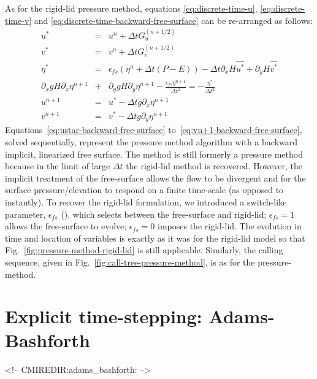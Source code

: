 As for the rigid-lid pressure method, equations
\ref{eq:discrete-time-u}, \ref{eq:discrete-time-v} and
\ref{eq:discrete-time-backward-free-surface} can be re-arranged as follows:
\begin{eqnarray}
u^{*} & = & u^{n} + \Delta t G_u^{(n+1/2)} \label{eq:ustar-backward-free-surface} \\
v^{*} & = & v^{n} + \Delta t G_v^{(n+1/2)} \label{eq:vstar-backward-free-surface} \\
\eta^* & = & \epsilon_{fs} \left( \eta^{n} + \Delta t (P-E) \right)- \Delta t 
  \partial_x H \widehat{u^{*}}
+ \partial_y H \widehat{v^{*}}
\\
  \partial_x g H \partial_x \eta^{n+1}
& + & \partial_y g H \partial_y \eta^{n+1}
 - \frac{\epsilon_{fs} \eta^{n+1}}{\Delta t^2}
 = 
- \frac{\eta^*}{\Delta t^2}
\label{eq:elliptic-backward-free-surface}
\\
u^{n+1} & = & u^{*} - \Delta t g \partial_x \eta^{n+1} \label{eq:un+1-backward-free-surface}\\
v^{n+1} & = & v^{*} - \Delta t g \partial_y \eta^{n+1} \label{eq:vn+1-backward-free-surface}
\end{eqnarray}
Equations~\ref{eq:ustar-backward-free-surface}
to~\ref{eq:vn+1-backward-free-surface}, solved sequentially, represent
the pressure method algorithm with a backward implicit, linearized
free surface. The method is still formerly a pressure method because
in the limit of large $\Delta t$ the rigid-lid method is
recovered. However, the implicit treatment of the free-surface allows
the flow to be divergent and for the surface pressure/elevation to
respond on a finite time-scale (as opposed to instantly). To recover
the rigid-lid formulation, we introduced a switch-like parameter,
$\epsilon_{fs}$ (), 
which selects between the free-surface and rigid-lid;
$\epsilon_{fs}=1$ allows the free-surface to evolve; $\epsilon_{fs}=0$
imposes the rigid-lid. The evolution in time and location of variables
is exactly as it was for the rigid-lid model so that
Fig.~\ref{fig:pressure-method-rigid-lid} is still
applicable. Similarly, the calling sequence, given in
Fig.~\ref{fig:call-tree-pressure-method}, is as for the
pressure-method.


\section{Explicit time-stepping: Adams-Bashforth}
\label{sec:adams-bashforth}
\begin{rawhtml}
<!-- CMIREDIR:adams_bashforth: -->
\end{rawhtml}

